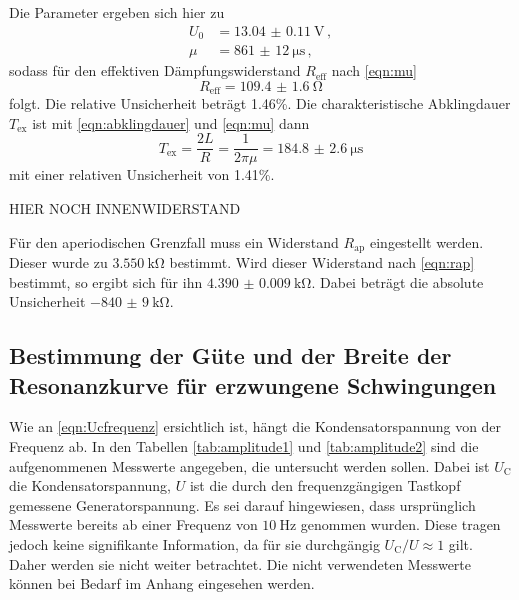 Die Parameter ergeben sich hier zu
\begin{align*}
  U_0 &= \SI{13.04(011)}{\volt}\,, \\
  \mu &= \SI{861(12)}{\micro\second}\,,
\end{align*}
sodass für den effektiven Dämpfungswiderstand $R_\text{eff}$ nach \eqref{eqn:mu}
\begin{equation*}
  R_\text{eff} = \SI{109.4(16)}{\ohm}
\end{equation*}
folgt. Die relative Unsicherheit beträgt 1.46\%. Die charakteristische
Abklingdauer $T_\text{ex}$ ist mit \eqref{eqn:abklingdauer} und \eqref{eqn:mu} dann
\begin{equation*}
  T_\text{ex} = \frac{2L}{R} = \frac{1}{2\pi \mu} = \SI{184.8(26)}{\micro\second}
\end{equation*}
mit einer relativen Unsicherheit von 1.41\%.

HIER NOCH INNENWIDERSTAND

Für den aperiodischen Grenzfall muss ein Widerstand $R_\text{ap}$ eingestellt werden.
Dieser wurde zu $\SI{3.550}{\kilo\ohm}$ bestimmt. Wird dieser Widerstand nach
\eqref{eqn:rap} bestimmt, so ergibt sich für ihn $\SI{4.390(0009)}{\kilo\ohm}$.
Dabei beträgt die absolute Unsicherheit $\SI{-840(9)}{\kilo\ohm}$.

\subsection{Bestimmung der Güte und der Breite der Resonanzkurve für erzwungene Schwingungen}

Wie an \eqref{eqn:Ucfrequenz} ersichtlich ist, hängt die Kondensatorspannung von
der Frequenz ab. In den Tabellen \ref{tab:amplitude1} und \ref{tab:amplitude2} sind die aufgenommenen Messwerte
angegeben, die untersucht werden sollen. Dabei ist $U_\text{C}$ die Kondensatorspannung,
$U$ ist die durch den frequenzgängigen Tastkopf gemessene Generatorspannung.
Es sei darauf hingewiesen, dass ursprünglich Messwerte bereits ab einer
Frequenz von $\SI{10}{\hertz}$ genommen wurden. Diese tragen jedoch keine
signifikante Information, da für sie durchgängig $U_\text{C}/U \approx 1$ gilt.
Daher werden sie nicht weiter betrachtet. Die nicht verwendeten Messwerte können
bei Bedarf im Anhang eingesehen werden.

